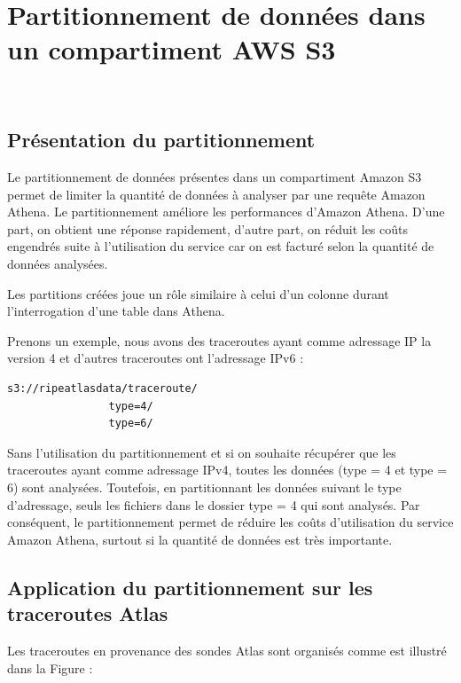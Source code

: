 \section{Partitionnement de données dans un compartiment AWS S3} \label{subsubsection:partitionnement}~

\subsection{Présentation du partitionnement}
Le partitionnement  de données présentes dans un compartiment Amazon S3 permet de limiter la quantité de données à analyser par une requête Amazon Athena. Le partitionnement améliore  les performances d'Amazon Athena. D'une part, on obtient une réponse rapidement, d'autre part, on réduit les coûts engendrés  suite à l'utilisation du service car on est facturé selon la quantité de données analysées.  

Les partitions créées joue un rôle similaire à celui d'un colonne durant l'interrogation d'une table dans Athena. 

Prenons un exemple, nous avons des traceroutes ayant comme adressage IP la version  4 et d'autres traceroutes ont l'adressage IPv6 :

\begin{lstlisting}
s3://ripeatlasdata/traceroute/
				type=4/
				type=6/
\end{lstlisting}

Sans l'utilisation du partitionnement et si on souhaite récupérer que les traceroutes ayant comme adressage IPv4, toutes les données (type = 4 et type = 6) sont analysées. Toutefois, en partitionnant les données suivant le type d'adressage, seuls les fichiers dans le dossier type = 4 qui sont analysés. Par conséquent, le partitionnement permet de réduire les coûts d'utilisation du service Amazon Athena, surtout si la quantité de données est très importante. 


\subsection{Application du partitionnement sur les traceroutes Atlas}

Les traceroutes en provenance des sondes Atlas sont organisés comme est illustré dans la Figure :

